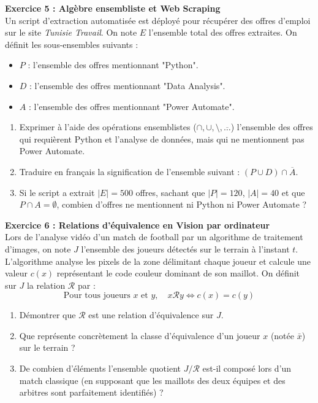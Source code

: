 \documentclass[12pt,a4paper]{report}
\begin{document}
\textbf{Exercice 5 : Algèbre ensembliste et Web Scraping} \\
Un script d'extraction automatisée est déployé pour récupérer des offres d'emploi sur le site \textit{Tunisie Travail}. On note $E$ l'ensemble total des offres extraites. 
On définit les sous-ensembles suivants :
\begin{itemize}
    \item $P$ : l'ensemble des offres mentionnant "Python".
    \item $D$ : l'ensemble des offres mentionnant "Data Analysis".
    \item $A$ : l'ensemble des offres mentionnant "Power Automate".
\end{itemize}
\begin{enumerate}
    \item Exprimer à l'aide des opérations ensemblistes ($\cap, \cup, \setminus, \overline{\dots}$) l'ensemble des offres qui requièrent Python et l'analyse de données, mais qui ne mentionnent pas Power Automate.
    \item Traduire en français la signification de l'ensemble suivant : $(P \cup D) \cap \overline{A}$.
    \item Si le script a extrait $|E| = 500$ offres, sachant que $|P| = 120$, $|A| = 40$ et que $P \cap A = \emptyset$, combien d'offres ne mentionnent ni Python ni Power Automate ?
\end{enumerate}

\textbf{Exercice 6 : Relations d'équivalence en Vision par ordinateur} \\
Lors de l'analyse vidéo d'un match de football par un algorithme de traitement d'images, on note $J$ l'ensemble des joueurs détectés sur le terrain à l'instant $t$.
L'algorithme analyse les pixels de la zone délimitant chaque joueur et calcule une valeur $c(x)$ représentant le code couleur dominant de son maillot.
On définit sur $J$ la relation $\mathcal{R}$ par :
$$ \text{Pour tous joueurs } x \text{ et } y, \quad x \mathcal{R} y \iff c(x) = c(y) $$
\begin{enumerate}
    \item Démontrer que $\mathcal{R}$ est une relation d'équivalence sur $J$.
    \item Que représente concrètement la classe d'équivalence d'un joueur $x$ (notée $\bar{x}$) sur le terrain ?
    \item De combien d'éléments l'ensemble quotient $J/\mathcal{R}$ est-il composé lors d'un match classique (en supposant que les maillots des deux équipes et des arbitres sont parfaitement identifiés) ?
\end{enumerate}
\end{document}

